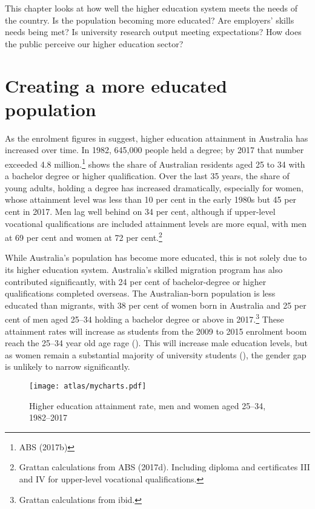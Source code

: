 \documentclass{grattan}
\begin{document}
This chapter looks at how well the higher education system meets the needs of the country. Is the population becoming more educated? Are employers' skills needs being met? Is university research output meeting expectations? How does the public perceive our higher education sector?

%
\section{Creating a more educated population}\label{sec:creating-a-more-educated-population}

As the enrolment figures in  suggest, higher education attainment in Australia has increased over time. In 1982, 645,000 people held a degree; by 2017 that number exceeded 4.8 million.\footnote{ABS (2017b)}  shows the share of Australian residents aged 25 to 34 with a bachelor degree or higher qualification. Over the last 35 years, the share of young adults, holding a degree has increased dramatically, especially for women, whose attainment level was less than 10 per cent in the early 1980s but 45 per cent in 2017. Men lag well behind on 34 per cent, although if upper-level vocational qualifications are included attainment levels are more equal, with men at 69 per cent and women at 72 per cent.\footnote{Grattan calculations from ABS (2017d). Including diploma and certificates III and IV for upper-level vocational qualifications.}

While Australia's population has become more educated, this is not solely due to its higher education system. Australia's skilled migration program has also contributed significantly, with 24 per cent of bachelor-degree or higher qualifications completed overseas. The Australian-born population is less educated than migrants, with 38 per cent of women born in Australia and 25 per cent of men aged 25--34 holding a bachelor degree or above in 2017.\footnote{Grattan calculations from ibid.} These attainment rates will increase as students from the 2009 to 2015 enrolment boom reach the 25--34 year old age rage (). This will increase male education levels, but as women remain a substantial majority of university students (), the gender gap is unlikely to narrow significantly.

    \begin{figure} %
    \caption{Higher education attainment rate, men and women aged 25--34, 1982--2017}\label{fig:higher-education-attainment-rate-men-and-women-aged-2534-19822017}
    \texttt{[image: atlas/mycharts.pdf]}
    \end{figure}
\end{document}
